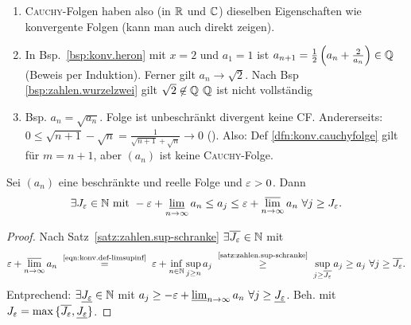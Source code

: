 \documentclass[12pt]{scrreprt}
\begin{document}
\begin{bem*}
  \begin{enumerate}
  \item \textsc{Cauchy}-Folgen haben also (in $\mathbb{R}$ und $\mathbb{C}$) dieselben
    Eigenschaften wie konvergente Folgen (kann man auch direkt zeigen).
  \item In Bsp.~\ref{bsp:konv.heron} mit $x=2$ und $a_1=1$ ist
    $a_{n+1}=\frac12\left(a_n+\frac{2}{a_n}\right) \in \mathbb{Q}$
    (Beweis per Induktion). Ferner gilt $a_n\to\sqrt{2}$. Nach Bsp
    \ref{bsp:zahlen.wurzelzwei} gilt $\sqrt{2}\not\in\mathbb{Q}$ \folgt
    $\mathbb{Q}$ ist nicht vollständig
  \item Bsp. $a_n=\sqrt{a_n}$. Folge ist unbeschränkt \folgt divergent
    \folgt keine CF. Andererseits: $0 \le \sqrt{n+1} - \sqrt{n} =
    \frac{1}{\sqrt{n+1}+\sqrt{n}} \to 0$ (\ninf). Also: Def
    \ref{dfn:konv.cauchyfolge} gilt für $m=n+1$, aber $(a_n)$ ist
    keine \textsc{Cauchy}-Folge.
  \end{enumerate}
\end{bem*}

\begin{lem}
  \label{lem:konv.lim-ep}
  Sei $(a_n)$ eine beschränkte und reelle Folge und $\varepsilon>0$. Dann
  \[\exists J_\varepsilon\in\mathbb{N} \text{ mit } -\varepsilon+\varliminf_{n\rightarrow\infty}{a_n} \le a_j \le
  \varepsilon+\varlimsup_{n\rightarrow\infty}{a_n}\ \forall j \ge J_\varepsilon.\]
\end{lem}
\begin{proof}
  Nach Satz~\ref{satz:zahlen.sup-schranke} $\exists \overline{J_\varepsilon}\in\mathbb{N}$
  mit \[\ep+\ls_{\ninf}{a_n} \nach{=}{\ref{eqn:konv.def-limsupinf}} \ep
  + \inf_{\nat{n}}{\sup_{j\ge n}{a_j}}
  \nach{\ge}{\ref{satz:zahlen.sup-schranke}}
  \sup_{j\ge\overline{J_\ep}}{a_j} \ge a_j \ \forall
  j\ge\overline{J_\ep}.\]
  Entprechend: $\exists \underline{J_\varepsilon}\in\mathbb{N}$ mit $a_j \ge -\varepsilon +
  \varliminf_{n\rightarrow\infty}{a_n} \ \forall j\ge\underline{J_\varepsilon}$. \folgt Beh. mit $J_\varepsilon = \max{\{\overline{J_\varepsilon}, \underline{J_\varepsilon}\}}$.
\end{proof}
\end{document}
